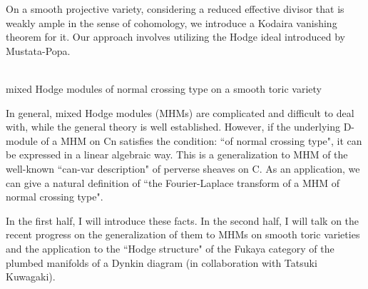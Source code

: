 \documentclass[dvipdfmx,a4paper,12pt]{article}
\theoremstyle{plain} %
\theoremstyle{definition} %
\begin{document}
\vskip3mm
On a smooth projective variety, considering a reduced effective divisor that is weakly ample in the sense of cohomology, we introduce a Kodaira vanishing theorem for it. Our approach involves utilizing the Hodge ideal introduced by Mustata-Popa.
\vskip6mm

\\
mixed Hodge modules of normal crossing type on a smooth toric variety

\vskip3mm
In general, mixed Hodge modules (MHMs) are complicated and difficult to 
deal with, while the general theory is well established.
However, if the underlying D-module of a MHM on Cn satisfies the 
condition: ``of normal crossing type",
it can be expressed in a linear algebraic way.
This is a generalization to MHM of the well-known ``can-var description" 
of perverse sheaves on C.
As an application, we can give a natural definition of ``the Fourier-Laplace transform of a MHM of normal crossing type".

In the first half, I will introduce these facts.
In the second half, I will talk on the recent progress on the 
generalization of them to MHMs on smooth toric varieties and the 
application to the ``Hodge structure" of the Fukaya category of the 
plumbed manifolds of a Dynkin diagram (in collaboration with Tatsuki 
Kuwagaki).
\vskip6mm
\end{document}
